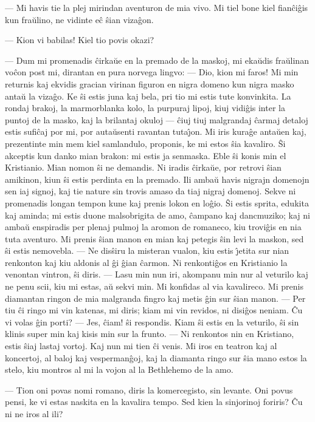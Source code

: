  --- Mi havis tie la plej mirindan aventuron de mia vivo. Mi tiel bone
kiel fian\^ci\^gis kun fra\u ulino, ne vidinte e\^c \^sian
viza\^gon.

 --- Kion vi babilas! Kiel tio povis okazi?

 --- Dum mi promenadis \^cirka\u ue en la premado de la maskoj, mi
eka\u udis fra\u ulinan vo\^con post mi, dirantan en pura norvega
lingvo: --- Dio, kion mi faros! Mi min returnis kaj ekvidis gracian
virinan figuron en nigra domeno kun nigra masko anta\u u la
viza\^go. Ke \^si estis juna kaj bela, pri tio mi estis tute
konvinkita. La rondaj brakoj, la marmorblanka kolo, la purpuraj
lipoj, kiuj vidi\^gis inter la puntoj de la masko, kaj la brilantaj
okuloj --- \^ciuj tiuj malgrandaj \^carmaj detaloj estis sufi\^caj
por mi, por auta\u usenti ravantan tuta\^{\j}on. Mi iris kura\^ge
anta\u uen kaj, prezentinte min mem kiel samlandulo, proponis, ke mi
estos \^sia kavaliro. \^Si akceptis kun danko mian brakon: mi estis
ja senmaska. Eble \^si konis min el Kristianio. Mian nomon \^si ne
demandis. Ni iradis \^cirka\u ue, por retrovi \^sian amikinon, kiun
\^si estis perdinta en la premado. Ili amba\u u havis nigrajn
domenojn sen iaj signoj, kaj tie nature sin trovis amaso da tiaj
nigraj domenoj. Sekve ni promenadis longan tempon kune kaj prenis
lokon en lo\^gio. \^Si estis sprita, edukita kaj aminda; mi estis
duone malsobrigita de amo, \^campano kaj dancmuziko; kaj ni amba\u u
enspiradis per plenaj pulmoj la aromon de romaneco, kiu trovi\^gis
en nia tuta aventuro. Mi prenis \^sian manon en mian kaj petegis
\^sin levi la maskon, sed \^si estis nemovebla. --- Ne dis\^siru la
misteran vualon, kiu estis \^{\j}etita sur nian renkonton kaj kiu
aldonis al \^gi \^gian \^carmon. Ni renkonti\^gos en Kristianio la
venontan vintron, \^si diris. --- Lasu min nun iri, akompanu min nur
al veturilo kaj ne penu scii, kiu mi estas, a\u u sekvi min. Mi
konfidas al via kavalireco. Mi prenis diamantan ringon de mia
malgranda fingro kaj metis \^gin sur \^sian manon. --- Per tiu \^ci
ringo mi vin katenas, mi diris; kiam mi vin revidos, ni disi\^gos
neniam. \^Cu vi volas \^gin porti? --- Jes, \^ciam! \^si respondis.
Kiam \^si estis en la veturilo, \^si sin klinis super min kaj kisis
min sur la frunto. --- Ni renkontos nin en Kristiano, estis \^siaj
lastaj vortoj. Kaj nun mi tien \^ci venis. Mi iros en teatron kaj al
koncertoj, al baloj kaj vesperman\^goj, kaj la diamanta ringo sur
\^sia mano estos la stelo, kiu montros al mi la vojon al la
Bethlehemo de la amo.

 --- Tion oni povas nomi romano, diris la komercegisto, sin levante.
Oni povus pensi, ke vi estas naskita en la kavalira tempo. Sed kien
la sinjorinoj foriris? \^Cu ni ne iros al ili?

